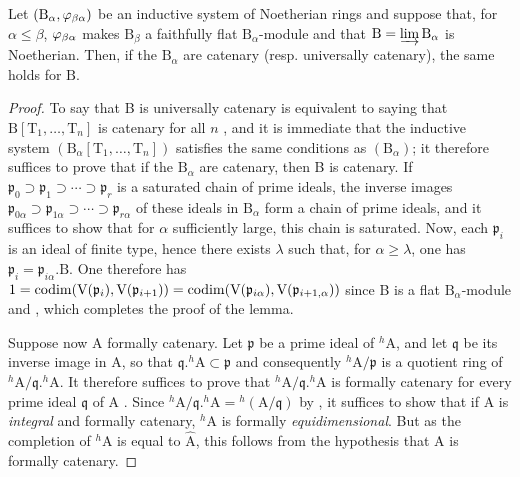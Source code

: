 \begin{lemma}[18.7.5.1]
\label{IV.18.7.5.1}
Let $(\mathrm{B}_\alpha,\varphi_{\beta\alpha})$ be an inductive system of Noetherian rings and suppose that, for $\alpha\leq\beta$, $\varphi_{\beta\alpha}$ makes $\mathrm{B}_\beta$ a faithfully flat $\mathrm{B}_\alpha$-module and that $\mathrm{B}=\varinjlim\mathrm{B}_\alpha$ is Noetherian.
Then, if the $\mathrm{B}_\alpha$ are catenary (resp. universally catenary), the same holds for $\mathrm{B}$.
\end{lemma}

\begin{proof}
To say that B is universally catenary is equivalent to saying that $\mathrm{B}[\mathrm{T}_1,\ldots,\mathrm{T}_n]$ is catenary for all $n$ , and it is immediate that the inductive system $(\mathrm{B}_\alpha[\mathrm{T}_1,\ldots,\mathrm{T}_n])$ satisfies the same conditions as $(\mathrm{B}_\alpha)$;
it therefore suffices to prove that if the $\mathrm{B}_\alpha$ are catenary, then B is catenary.
If $\mathfrak{p}_0\supset\mathfrak{p}_1\supset\cdots\supset\mathfrak{p}_r$ is a saturated chain of prime ideals, the inverse images $\mathfrak{p}_{0\alpha}\supset\mathfrak{p}_{1\alpha}\supset\cdots\supset\mathfrak{p}_{r\alpha}$ of these ideals in $\mathrm{B}_\alpha$ form a chain of prime ideals, and it suffices to show that for $\alpha$ sufficiently large, this chain is saturated.
Now, each $\mathfrak{p}_i$ is an ideal of finite type, hence there exists $\lambda$ such that, for $\alpha\geq\lambda$, one has $\mathfrak{p}_i=\mathfrak{p}_{i\alpha}.\mathrm{B}$.
One therefore has $1=\operatorname{codim}(\mathrm{V}(\mathfrak{p}_i),\mathrm{V}(\mathfrak{p}_{i+1}))=\operatorname{codim}(\mathrm{V}(\mathfrak{p}_{i\alpha}),\mathrm{V}(\mathfrak{p}_{i+1,\alpha}))$ since B is a flat $\mathrm{B}_\alpha$-module  and , which completes the proof of the lemma.

Suppose now A formally catenary.
Let $\mathfrak{p}$ be a prime ideal of ${}^h\!\mathrm{A}$, and let $\mathfrak{q}$ be its inverse image in A, so that $\mathfrak{q}.{}^h\!\mathrm{A}\subset\mathfrak{p}$ and consequently ${}^h\!\mathrm{A}/\mathfrak{p}$ is a quotient ring of ${}^h\!\mathrm{A}/\mathfrak{q}.{}^h\!\mathrm{A}$.  It therefore suffices to prove that ${}^h\!\mathrm{A}/\mathfrak{q}.{}^h\!\mathrm{A}$ is formally catenary for every prime ideal $\mathfrak{q}$ of A .  Since ${}^h\!\mathrm{A}/\mathfrak{q}.{}^h\!\mathrm{A}={}^h(\mathrm{A}/\mathfrak{q})$ by , it suffices  to show that if A is \emph{integral} and formally catenary, ${}^h\!\mathrm{A}$ is formally \emph{equidimensional}.
But as the completion of ${}^h\!\mathrm{A}$ is equal to $\hat{\mathrm{A}}$, this follows from the hypothesis that A is formally catenary.


\end{proof}
